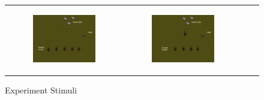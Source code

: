 \documentclass[11pt,letterpaper]{article}
\begin{document}
\begin{figure}
{\begin{tabular}{cccc}
\begin{subfigure}[b]{0.18\textwidth}\includegraphics[width=\textwidth]{figures/turrets.jpeg}\caption{}\label{fig:turrets-a}\end{subfigure}&
\begin{subfigure}[b]{0.18\textwidth}\includegraphics[width=\textwidth]{figures/turrets-plus-one.jpeg}\caption{}\label{fig:turrets-b}\end{subfigure}
\end{tabular}
}
\caption{Experiment Stimuli}
\label{fig:exp_stimuli}
\end{figure}
\end{document}
